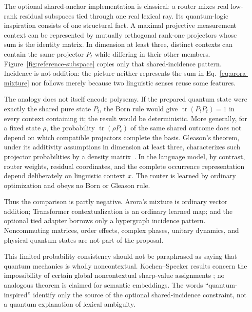 \documentclass[
  aps,
  reprint,
  superscriptaddress,
  floatfix,
  nofootinbib,
  longbibliography
]{revtex4-2}
\begin{document}
The optional shared-anchor implementation is classical: a router mixes real
low-rank residual subspaces tied through one real lexical ray.  Its
quantum-logic inspiration consists of one structural fact.  A maximal
projective measurement context can be represented by mutually orthogonal
rank-one projectors whose sum is the identity matrix.  In dimension at least
three, distinct contexts can contain the same projector $P_t$ while differing
in their other members.  Figure~\ref{fig:reference-subspace} copies only that
shared-incidence pattern.  Incidence is not addition: the picture neither
represents the sum in Eq.~\eqref{eq:arora-mixture} nor follows merely because
two linguistic senses reuse some features.

The analogy does not itself encode polysemy.  If the prepared quantum state
were exactly the shared pure state $P_t$, the Born rule would give
$\operatorname{tr}(P_tP_t)=1$ in every context containing it; the result would
be deterministic.  More generally, for a fixed state $\rho$, the probability
$\operatorname{tr}(\rho P_t)$ of the same shared outcome does not depend on
which compatible projectors complete the basis.  Gleason's theorem, under its
additivity assumptions in dimension at least three, characterizes such
projector probabilities by a density matrix~\cite{Gleason,ramanathan-2024}.
In the language model, by contrast, router weights, residual coordinates, and
the complete occurrence representation depend deliberately on linguistic
context $x$.  The router is learned by ordinary optimization and obeys no Born
or Gleason rule.

Thus the comparison is partly negative.  Arora's mixture is ordinary vector
addition; Transformer contextualization is an ordinary learned map; and the
optional tied adapter borrows only a hypergraph incidence pattern.
Noncommuting matrices, order effects, complex phases, unitary dynamics, and
physical quantum states are not part of the proposal.

This limited probability consistency should not be paraphrased as saying that
quantum mechanics is wholly noncontextual.  Kochen--Specker results concern the
impossibility of certain global noncontextual sharp-value assignments
\cite{specker-60,kochen1}; no analogous theorem is claimed for semantic
embeddings.  The words ``quantum-inspired'' identify only the source of the
optional shared-incidence constraint, not a quantum explanation of lexical
ambiguity.

\end{document}
